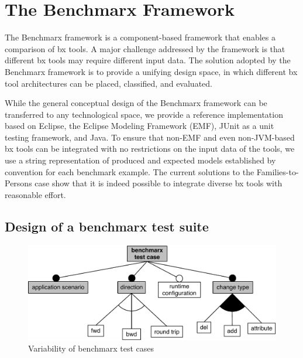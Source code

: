 \section{The Benchmarx Framework}
\label{sec:Benchmarx}

%

The Benchmarx framework is a component-based framework that enables a comparison of bx tools. 
A major challenge addressed by the framework is that different bx tools may require different input data. 
The solution adopted by the Benchmarx framework is to provide a unifying design space, in which different bx tool architectures can be placed, classified, and evaluated. 

While the general conceptual design of the Benchmarx framework can be transferred to any technological space, we provide a reference implementation based on Eclipse, the Eclipse Modeling Framework (EMF), JUnit as a unit testing framework, and Java.
To ensure that non-EMF and even non-JVM-based bx tools can be integrated with no restrictions on the input data of the tools, we use a string representation of produced and expected models established by convention for each benchmark example.
The current solutions to the Families-to-Persons case show that it is indeed possible to integrate diverse bx tools with reasonable effort.

\subsection{Design of a benchmarx test suite}
\label{sec:DesignOfABenchmarxTestSuite}

\begin{figure}[t!]
	\centering
	\includegraphics[width=\columnwidth]{diagrams/framework/feature-model-benchmarx-test-case}
	\caption{Variability of benchmarx test cases}
	\label{fig:featureModelBenchmarxTestCase}
\end{figure}

